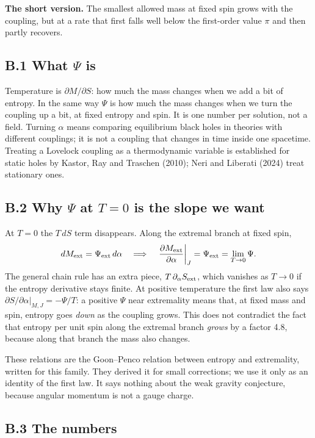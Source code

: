 \documentclass[12pt,a4paper]{article}
\begin{document}
\textbf{The short version.} The smallest allowed mass at fixed spin grows with the
coupling, but at a rate that first falls well below the first-order value $\pi$
and then partly recovers.

\subsection*{B.1 What $\Psi$ is}

Temperature is $\partial M/\partial S$: how much the mass changes when we add a bit
of entropy. In the same way $\Psi$ is how much the mass changes when we turn the
coupling up a bit, at fixed entropy and spin. It is one number per solution, not a
field. Turning $\alpha$ means comparing equilibrium black holes in theories with
different couplings; it is not a coupling that changes in time inside one spacetime.
Treating a Lovelock coupling as a thermodynamic variable is established for static
holes by Kastor, Ray and Traschen (2010); Neri and Liberati (2024) treat stationary
ones.

\subsection*{B.2 Why $\Psi$ at $T=0$ is the slope we want}

At $T=0$ the $T\,dS$ term disappears. Along the extremal branch at fixed spin,
\[
dM_{\rm ext}=\Psi_{\rm ext}\,d\alpha\quad\Longrightarrow\quad
\left.\frac{\partial M_{\rm ext}}{\partial\alpha}\right|_J=\Psi_{\rm ext}=\lim_{T\to0}\Psi .
\]
The general chain rule has an extra piece, $T\,\partial_\alpha S_{\rm ext}$, which
vanishes as $T\to0$ if the entropy derivative stays finite. At positive temperature
the first law also says $\partial S/\partial\alpha|_{M,J}=-\Psi/T$: a positive
$\Psi$ near extremality means that, at fixed mass and spin, entropy goes \emph{down}
as the coupling grows. This does not contradict the fact that entropy per unit spin
along the extremal branch \emph{grows} by a factor 4.8, because along that branch
the mass also changes.

These relations are the Goon--Penco relation between entropy and extremality, written
for this family. They derived it for small corrections; we use it only as an identity
of the first law. It says nothing about the weak gravity conjecture, because angular
momentum is not a gauge charge.

\subsection*{B.3 The numbers}
\end{document}
